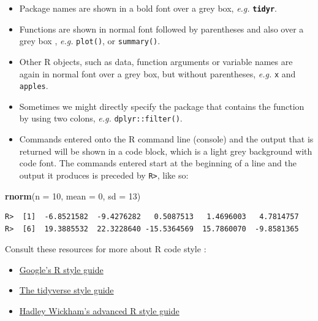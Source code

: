 \documentclass[]{book}
\newenvironment{Shaded}{\begin{snugshade}}{\end{snugshade}}
\newcommand{\KeywordTok}[1]{\textcolor[rgb]{0.13,0.29,0.53}{\textbf{#1}}}
\newcommand{\DataTypeTok}[1]{\textcolor[rgb]{0.13,0.29,0.53}{#1}}
\newcommand{\DecValTok}[1]{\textcolor[rgb]{0.00,0.00,0.81}{#1}}
\newcommand{\NormalTok}[1]{#1}
\providecommand{\tightlist}{%
  \setlength{\itemsep}{0pt}\setlength{\parskip}{0pt}}
\theoremstyle{definition}
\theoremstyle{definition}
\theoremstyle{definition}
\theoremstyle{remark}
\begin{document}
\begin{itemize}
\tightlist
\item
  Package names are shown in a bold font over a grey box, \emph{e.g.}
  \textbf{\texttt{tidyr}}.
\item
  Functions are shown in normal font followed by parentheses and also
  over a grey box , \emph{e.g.} \texttt{plot()}, or \texttt{summary()}.
\item
  Other R objects, such as data, function arguments or variable names
  are again in normal font over a grey box, but without parentheses,
  \emph{e.g.} \texttt{x} and \texttt{apples}.
\item
  Sometimes we might directly specify the package that contains the
  function by using two colons, \emph{e.g.} \texttt{dplyr::filter()}.
\item
  Commands entered onto the R command line (console) and the output that
  is returned will be shown in a code block, which is a light grey
  background with code font. The commands entered start at the beginning
  of a line and the output it produces is preceded by
  \texttt{R\textgreater{}}, like so:
\end{itemize}

\begin{Shaded}
\begin{Highlighting}[]
\KeywordTok{rnorm}\NormalTok{(}\DataTypeTok{n =} \DecValTok{10}\NormalTok{, }\DataTypeTok{mean =} \DecValTok{0}\NormalTok{, }\DataTypeTok{sd =} \DecValTok{13}\NormalTok{)}
\end{Highlighting}
\end{Shaded}

\begin{verbatim}
R>  [1]  -6.8521582  -9.4276282   0.5087513   1.4696003   4.7814757
R>  [6]  19.3885532  22.3228640 -15.5364569  15.7860070  -9.8581365
\end{verbatim}

Consult these resources for more about R code style :

\begin{itemize}
\tightlist
\item
  \href{https://google.github.io/styleguide/Rguide.xml}{Google's R style
  guide}
\item
  \href{http://style.tidyverse.org}{The tidyverse style guide}
\item
  \href{http://adv-r.had.co.nz/Style.html}{Hadley Wickham's advanced R
  style guide}
\end{itemize}
\end{document}
